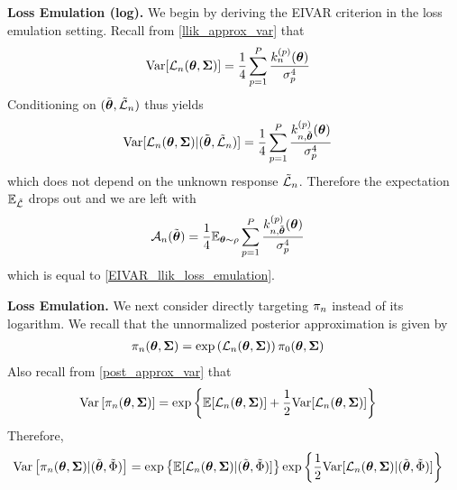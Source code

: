\documentclass[12pt]{article}
\begin{document}
\bigskip
\noindent
\textbf{Loss Emulation (log).} 
We begin by deriving the EIVAR criterion in the loss emulation setting. Recall from \ref{llik_approx_var} that 
\begin{align*}
\mathrm{Var}[\mathcal{L}_{n}(\boldsymbol{\theta}, \boldsymbol{\Sigma})] &= \frac{1}{4} \sum_{p = 1}^{P} \frac{k_{n}^{(p)}(\boldsymbol{\theta})}{\sigma_{p}^4}
\end{align*}
Conditioning on $(\tilde{\boldsymbol{\theta}}, \tilde{\mathcal{L}}_{n})$ thus yields 
\begin{align*}
\mathrm{Var}[\mathcal{L}_{n}(\boldsymbol{\theta}, \boldsymbol{\Sigma}) | (\tilde{\boldsymbol{\theta}}, \tilde{\mathcal{L}}_{n})] &= \frac{1}{4} \sum_{p = 1}^{P} \frac{k_{n, \tilde{\boldsymbol{\theta}}}^{(p)}(\boldsymbol{\theta})}{\sigma_{p}^4}
\end{align*}
which does not depend on the unknown response $\tilde{\mathcal{L}}_{n}$. Therefore the expectation $\mathbb{E}_{\tilde{\mathcal{L}}}$ drops out and we are left with 
\begin{align*}
\mathcal{A}_{n}(\tilde{\boldsymbol{\theta}}) &= \frac{1}{4} \mathbb{E}_{\boldsymbol{\theta} \sim \rho} \sum_{p = 1}^{P} \frac{k_{n, \tilde{\boldsymbol{\theta}}}^{(p)}(\boldsymbol{\theta})}{\sigma_{p}^4}
\end{align*}
which is equal to \ref{EIVAR_llik_loss_emulation}.

\bigskip
\noindent
\textbf{Loss Emulation.}
 We next consider directly targeting $\pi_{n}$ instead of its logarithm. We recall that the unnormalized posterior approximation is given 
 by 
 \begin{align*}
 \pi_{n}(\boldsymbol{\theta}, \boldsymbol{\Sigma}) &= \exp\left(\mathcal{L}_{n}(\boldsymbol{\theta}, \boldsymbol{\Sigma}) \right)\pi_0(\boldsymbol{\theta}, \boldsymbol{\Sigma})
 \end{align*}
 Also recall from \ref{post_approx_var} that 
 \begin{align*}
 \mathrm{Var}\left[\pi_{n}(\boldsymbol{\theta}, \boldsymbol{\Sigma})\right] &= \exp\left\{\mathbb{E}[\mathcal{L}_{n}(\boldsymbol{\theta}, \boldsymbol{\Sigma})] + \frac{1}{2}\mathrm{Var}[\mathcal{L}_{n}(\boldsymbol{\theta}, \boldsymbol{\Sigma})] \right\}
\end{align*}
Therefore, 
 \begin{align*}
 \mathrm{Var}\left[\pi_{n}(\boldsymbol{\theta}, \boldsymbol{\Sigma}) | (\tilde{\boldsymbol{\theta}}, \tilde{\Phi})\right] &= \exp\left\{\mathbb{E}[\mathcal{L}_{n}(\boldsymbol{\theta}, \boldsymbol{\Sigma}) | (\tilde{\boldsymbol{\theta}}, \tilde{\Phi})]\right\} \exp\left\{\frac{1}{2}\mathrm{Var}[\mathcal{L}_{n}(\boldsymbol{\theta}, \boldsymbol{\Sigma}) | (\tilde{\boldsymbol{\theta}}, \tilde{\Phi})] \right\}
\end{align*}
\end{document}
